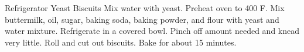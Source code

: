 \documentclass[../main.tex]{subfiles}
\begin{document}
\begin{recipe}{Refrigerator Yeast Biscuits}{}{}
    Mix water with yeast.
    Preheat oven to 400\degrees{} F. Mix buttermilk, oil, sugar, baking
    soda, baking powder, and flour with yeast and water mixture.
    Refrigerate in a covered bowl. Pinch off amount needed and knead
    very little. Roll and cut out biscuits. Bake for about 15 minutes.
\end{recipe}
\end{document}

